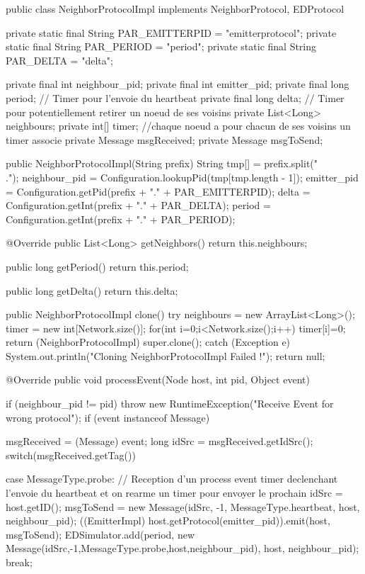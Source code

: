 \documentclass[10pt]{report}
\begin{document}
\begin{boxedlisting}
public class NeighborProtocolImpl implements NeighborProtocol, EDProtocol {
	private static final String PAR_EMITTERPID = "emitterprotocol";
	private static final String PAR_PERIOD = "period";
	private static final String PAR_DELTA = "delta";

	private final int neighbour_pid;
	private final int emitter_pid;
	private final long period; // Timer pour l'envoie du heartbeat
	private final long delta; // Timer pour potentiellement retirer un noeud de ses voisins 
	private List<Long> neighbours;
	private int[] timer; //chaque noeud a pour chacun de ses voisins un timer associe
	private Message msgReceived;
	private Message msgToSend;
	
	public NeighborProtocolImpl(String prefix) {
		String tmp[] = prefix.split("\\.");
		neighbour_pid = Configuration.lookupPid(tmp[tmp.length - 1]);
		emitter_pid = Configuration.getPid(prefix + "." + PAR_EMITTERPID);
		delta = Configuration.getInt(prefix + "." + PAR_DELTA);
		period = Configuration.getInt(prefix + "." + PAR_PERIOD);
	}

	@Override
	public List<Long> getNeighbors() {
		return this.neighbours;
	}

	public long getPeriod() {
		return this.period;
	}

	public long getDelta() {
		return this.delta;
	}

	public NeighborProtocolImpl clone() {
		try {
			neighbours = new ArrayList<Long>();
			timer = new int[Network.size()];
			for(int i=0;i<Network.size();i++) {
				timer[i]=0;
			}
			return (NeighborProtocolImpl) super.clone();
		} catch (Exception e) {
			System.out.println("Cloning NeighborProtocolImpl Failed !");
		}
		return null;
	}

	@Override
	public void processEvent(Node host, int pid, Object event) {
		if (neighbour_pid != pid) {
			throw new RuntimeException("Receive Event for wrong protocol");
		}
		if (event instanceof Message) {
			msgReceived = (Message) event;	
			long idSrc = msgReceived.getIdSrc();
			switch(msgReceived.getTag()) {
			case MessageType.probe:
				// Reception d'un process event timer declenchant l'envoie du heartbeat et on rearme un timer pour envoyer le prochain
				idSrc = host.getID();
				msgToSend = new Message(idSrc, -1, MessageType.heartbeat, host, neighbour_pid);
				((EmitterImpl) host.getProtocol(emitter_pid)).emit(host, msgToSend);
				EDSimulator.add(period, new Message(idSrc,-1,MessageType.probe,host,neighbour_pid), host, neighbour_pid);
				break;
				
}}}}
\end{boxedlisting}
\end{document}
